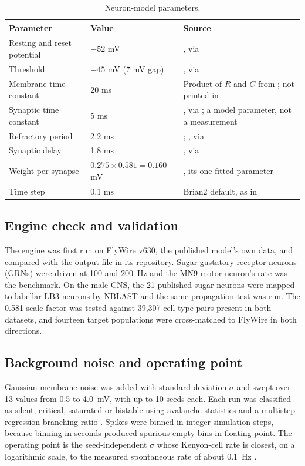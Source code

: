 \documentclass[11pt]{article}
\begin{document}
\begin{table}[t]
\centering\small
\caption{Neuron-model parameters.}
\label{tab:params}
\begin{tabularx}{\textwidth}{@{}l l L@{}}
\toprule
Parameter & Value & Source \\
\midrule
Resting and reset potential & $-52$ mV & \citet{kakaria2017}, via \citet{shiu2024} \\
Threshold & $-45$ mV (7 mV gap) & \citet{kakaria2017}, via \citet{shiu2024} \\
Membrane time constant & 20 ms & Product of $R$ and $C$ from \citet{kakaria2017}; not printed in \citet{shiu2024} \\
Synaptic time constant & 5 ms & \citet{jurgensen2021}, via \citet{shiu2024}; a model parameter, not a measurement \\
Refractory period & 2.2 ms & \citet{lazar2021}; \citet{kakaria2017}, via \citet{shiu2024} \\
Synaptic delay & 1.8 ms & \citet{paul2015}, via \citet{shiu2024} \\
Weight per synapse & $0.275 \times 0.581 = 0.160$ mV & \citet{shiu2024}, its one fitted parameter \\
Time step & 0.1 ms & Brian2 default, as in \citet{shiu2024} \\
\bottomrule
\end{tabularx}
\end{table}

\subsection{Engine check and validation}
The engine was first run on FlyWire v630, the published model's own data, and compared with the output file in its repository. Sugar gustatory receptor neurons (GRNs) were driven at 100 and 200~Hz and the MN9 motor neuron's rate was the benchmark. On the male CNS, the 21 published sugar neurons were mapped to labellar LB3 neurons by NBLAST and the same propagation test was run. The 0.581 scale factor was tested against 39,307 cell-type pairs present in both datasets, and fourteen target populations were cross-matched to FlyWire in both directions.

\subsection{Background noise and operating point}\label{sec:noise}
Gaussian membrane noise was added with standard deviation $\sigma$ and swept over 13 values from 0.5 to 4.0~mV, with up to 10 seeds each. Each run was classified as silent, critical, saturated or bistable using avalanche statistics \citep{beggs2003} and a multistep-regression branching ratio \citep{wilting2018}. Spikes were binned in integer simulation steps, because binning in seconds produced spurious empty bins in floating point. The operating point is the seed-independent $\sigma$ whose Kenyon-cell rate is closest, on a logarithmic scale, to the measured spontaneous rate of about 0.1~Hz \citep{turner2008}.
\end{document}
